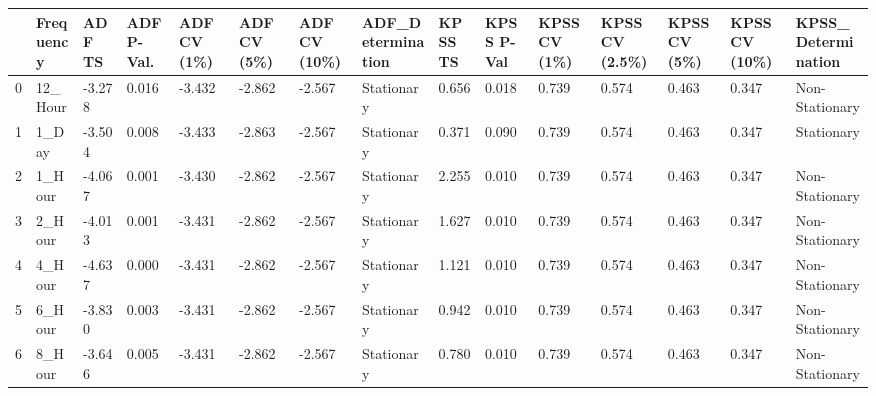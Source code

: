 \begin{tabular}{lllllllllllllll}
\toprule
 & Frequency & ADF TS & ADF P-Val. & ADF CV (1\%) & ADF CV (5\%) & ADF CV (10\%) & ADF_Determination & KPSS TS & KPSS P-Val & KPSS CV (1\%) & KPSS CV (2.5\%) & KPSS CV (5\%) & KPSS CV (10\%) & KPSS_Determination \\
\midrule
0 & 12_Hour & -3.278 & 0.016 & -3.432 & -2.862 & -2.567 & Stationary & 0.656 & 0.018 & 0.739 & 0.574 & 0.463 & 0.347 & Non-Stationary \\
1 & 1_Day & -3.504 & 0.008 & -3.433 & -2.863 & -2.567 & Stationary & 0.371 & 0.090 & 0.739 & 0.574 & 0.463 & 0.347 & Stationary \\
2 & 1_Hour & -4.067 & 0.001 & -3.430 & -2.862 & -2.567 & Stationary & 2.255 & 0.010 & 0.739 & 0.574 & 0.463 & 0.347 & Non-Stationary \\
3 & 2_Hour & -4.013 & 0.001 & -3.431 & -2.862 & -2.567 & Stationary & 1.627 & 0.010 & 0.739 & 0.574 & 0.463 & 0.347 & Non-Stationary \\
4 & 4_Hour & -4.637 & 0.000 & -3.431 & -2.862 & -2.567 & Stationary & 1.121 & 0.010 & 0.739 & 0.574 & 0.463 & 0.347 & Non-Stationary \\
5 & 6_Hour & -3.830 & 0.003 & -3.431 & -2.862 & -2.567 & Stationary & 0.942 & 0.010 & 0.739 & 0.574 & 0.463 & 0.347 & Non-Stationary \\
6 & 8_Hour & -3.646 & 0.005 & -3.431 & -2.862 & -2.567 & Stationary & 0.780 & 0.010 & 0.739 & 0.574 & 0.463 & 0.347 & Non-Stationary \\
\bottomrule
\end{tabular}
